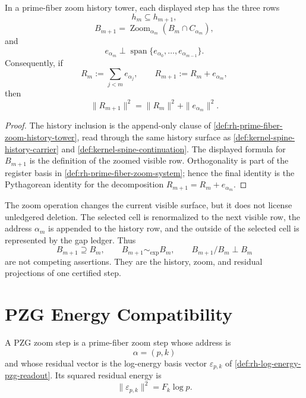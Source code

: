 \begin{theorem}
\label{thm:rh-prime-fiber-zoom-history-similarity-orthogonality}
In a prime-fiber zoom history tower, each displayed step has the three
rows
$$
h_m\subseteq h_{m+1},
$$
$$
B_{m+1}
=
\operatorname{Zoom}_{\alpha_m}(B_m\cap C_{\alpha_m}),
$$
and
$$
e_{\alpha_m}\perp
\operatorname{span}\{e_{\alpha_0},\ldots,e_{\alpha_{m-1}}\}.
$$
Consequently, if
$$
R_m:=\sum_{j<m}e_{\alpha_j},
\qquad
R_{m+1}:=R_m+e_{\alpha_m},
$$
then
$$
\|R_{m+1}\|^2
=
\|R_m\|^2+\|e_{\alpha_m}\|^2.
$$
\end{theorem}

\begin{proof}
The history inclusion is the append-only clause of
\autoref{def:rh-prime-fiber-zoom-history-tower}, read through the same
history surface as
\autoref{def:kernel-spine-history-carrier} and
\autoref{def:kernel-spine-continuation}. The displayed formula for
$B_{m+1}$ is the definition of the zoomed visible row. Orthogonality is
part of the register basis in
\autoref{def:rh-prime-fiber-zoom-system}; hence the final identity is
the Pythagorean identity for the decomposition
$R_{m+1}=R_m+e_{\alpha_m}$.
\end{proof}

\begin{principle}
\label{prin:rh-prime-fiber-zoom-not-erasure}
The zoom operation changes the current visible surface, but it does not
license unledgered deletion. The selected cell is renormalized to the
next visible row, the address $\alpha_m$ is appended to the history row,
and the outside of the selected cell is represented by the gap ledger.
Thus
$$
B_{m+1}\supseteq B_m,
\qquad
B_{m+1}\sim_{\exp} B_m,
\qquad
B_{m+1}/B_m\perp B_m
$$
are not competing assertions. They are the history, zoom, and residual
projections of one certified step.
\end{principle}

\section{PZG Energy Compatibility}
\label{sec:rh-prime-fiber-zoom-pzg-energy}

\begin{definition}
\label{def:rh-pzg-zoom-step}
A PZG zoom step is a prime-fiber zoom step whose address is
$$
\alpha=(p,k)
$$
and whose residual vector is the log-energy basis vector
$\varepsilon_{p,k}$ of
\autoref{def:rh-log-energy-pzg-readout}. Its squared residual energy is
$$
\|\varepsilon_{p,k}\|^2=F_k\log p.
$$
\end{definition}

